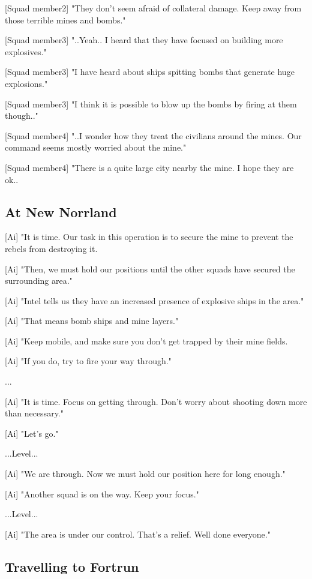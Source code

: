 \documentclass[a4paper,12pt]{article}
\begin{document}
[Squad member2] "They don't seem afraid of collateral damage. Keep away from those terrible mines and bombs."

[Squad member3] "..Yeah.. I heard that they have focused on building more explosives."

[Squad member3] "I have heard about ships spitting bombs that generate huge explosions." 

[Squad member3] "I think it is possible to blow up the bombs by firing at them though.."

[Squad member4] "..I wonder how they treat the civilians around the mines. Our command seems mostly worried
about the mine." 

[Squad member4] "There is a quite large city nearby the mine. I hope they are ok..

\subsection{At New Norrland}

[Ai] "It is time. Our task in this operation is to secure the mine to prevent the rebels from destroying it. 

[Ai] "Then, we must hold our positions until the other squads have secured the surrounding area."

[Ai] "Intel tells us they have an increased presence of explosive ships in the area." 

[Ai] "That means bomb ships and mine layers." 

[Ai] "Keep mobile, and make sure you don't get trapped by their mine fields. 

[Ai] "If you do, try to fire your way through."

...

[Ai] "It is time. Focus on getting through. Don't worry about shooting
down more than necessary." 

[Ai] "Let's go."

...Level...

[Ai] "We are through. Now we must hold our position here for long enough."

[Ai] "Another squad is on the way. Keep your focus."

...Level...

[Ai] "The area is under our control. That's a relief. Well done everyone."

\subsection{Travelling to Fortrun}
\end{document}

